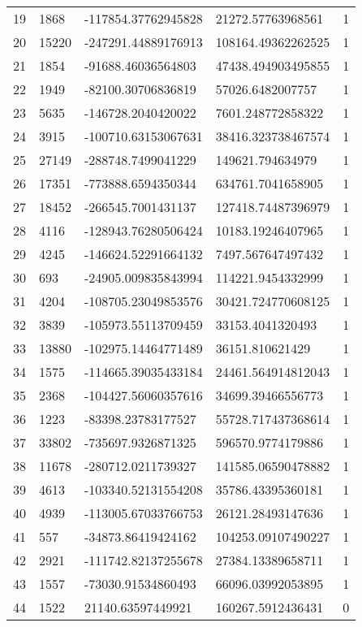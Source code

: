 \begin{longtable}{lllll}
    19 & 1868 & -117854.37762945828 & 21272.57763968561 & 1 \\
    20 & 15220 & -247291.44889176913 & 108164.49362262525 & 1 \\
    21 & 1854 & -91688.46036564803 & 47438.494903495855 & 1 \\
    22 & 1949 & -82100.30706836819 & 57026.6482007757 & 1 \\
    23 & 5635 & -146728.2040420022 & 7601.248772858322 & 1 \\
    24 & 3915 & -100710.63153067631 & 38416.323738467574 & 1 \\
    25 & 27149 & -288748.7499041229 & 149621.794634979 & 1 \\
    26 & 17351 & -773888.6594350344 & 634761.7041658905 & 1 \\
    27 & 18452 & -266545.7001431137 & 127418.74487396979 & 1 \\
    28 & 4116 & -128943.76280506424 & 10183.19246407965 & 1 \\
    29 & 4245 & -146624.52291664132 & 7497.567647497432 & 1 \\
    30 & 693 & -24905.009835843994 & 114221.9454332999 & 1 \\
    31 & 4204 & -108705.23049853576 & 30421.724770608125 & 1 \\
    32 & 3839 & -105973.55113709459 & 33153.4041320493 & 1 \\
    33 & 13880 & -102975.14464771489 & 36151.810621429 & 1 \\
    34 & 1575 & -114665.39035433184 & 24461.564914812043 & 1 \\
    35 & 2368 & -104427.56060357616 & 34699.39466556773 & 1 \\
    36 & 1223 & -83398.23783177527 & 55728.717437368614 & 1 \\
    37 & 33802 & -735697.9326871325 & 596570.9774179886 & 1 \\
    38 & 11678 & -280712.0211739327 & 141585.06590478882 & 1 \\
    39 & 4613 & -103340.52131554208 & 35786.43395360181 & 1 \\
    40 & 4939 & -113005.67033766753 & 26121.28493147636 & 1 \\
    41 & 557 & -34873.86419424162 & 104253.09107490227 & 1 \\
    42 & 2921 & -111742.82137255678 & 27384.13389658711 & 1 \\
    43 & 1557 & -73030.91534860493 & 66096.03992053895 & 1 \\
    44 & 1522 & 21140.63597449921 & 160267.5912436431 & 0 \\

\end{longtable}
